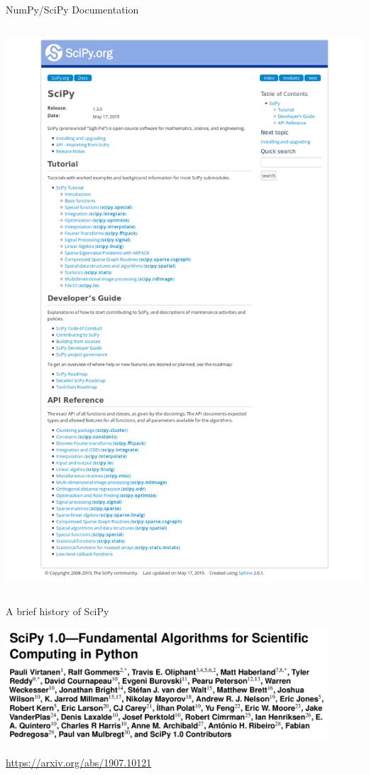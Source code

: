 \documentclass[svgnames]{beamer}
\begin{document}
\begin{frame}{NumPy/SciPy Documentation}
\begin{columns}
\begin{column}{0.55\textwidth}
   \includegraphics[width=\textwidth]{docs-scipy}
  \end{column}%
 \end{columns}
\end{frame}

\begin{frame}{A brief history of SciPy}
 \begin{center}
  \includegraphics[width=0.9\textwidth]{1907_10121}
 \end{center}
 
 \begin{flushright}
  \url{https://arxiv.org/abs/1907.10121}
 \end{flushright}
\end{frame}
\end{document}
